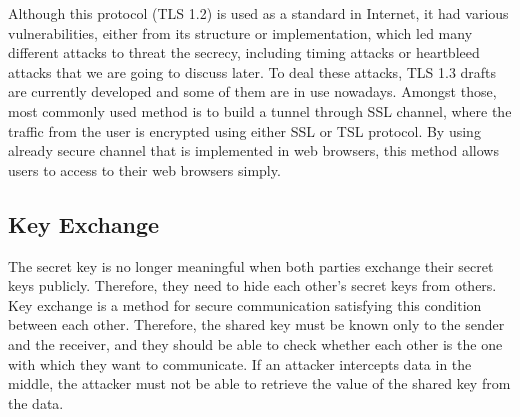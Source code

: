 \documentclass[a4paper]{article}
\begin{document}
Although this protocol (TLS 1.2) is used as a standard in Internet, it had various vulnerabilities, either from its structure or implementation, which led many different attacks to threat the secrecy, including timing attacks or heartbleed attacks that we are going to discuss later. To deal these attacks, TLS 1.3 drafts are currently developed and some of them are in use nowadays. Amongst those, most commonly used method is to build a tunnel through SSL channel, where the traffic from the user is encrypted using either SSL or TSL protocol. By using already secure channel that is implemented in web browsers, this method allows users to access to their web browsers simply.

\subsection{Key Exchange}
The secret key is no longer meaningful when both parties exchange their secret keys publicly.
Therefore, they need to hide each other's secret keys from others. Key exchange is a method for secure communication satisfying this condition between each other. Therefore, the shared key must be known only to the sender and the receiver, and they should be able to check whether each other is the one with which they want to communicate. If an attacker intercepts data in the middle, the attacker must not be able to retrieve the value of the shared key from the data.
\end{document}
